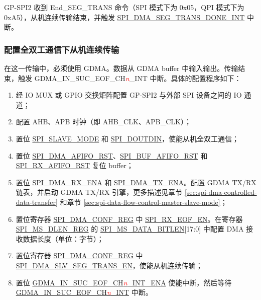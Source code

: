 \documentclass[main\_\_CN.tex]{subfiles}
\begin{document}
GP-SPI2 收到 End\_SEG\_TRANS 命令（SPI 模式下为 0x05，QPI 模式下为 0xA5），从机连续传输结束，并触发 \hyperref[int:SPIDMASEGTRANSDONEINT]{SPI\_DMA\_SEG\_TRANS\_DONE\_INT} 中断。

\subsubsection{配置全双工通信下从机连续传输}\label{para:spi-slave-fd-seg-trans}
在这一传输中，必须使用 GDMA。数据从 GDMA buffer 中输入输出。传输结束，触发 GDMA\_IN\_SUC\_EOF\_CH\textcolor{red}{\it{n}}\_INT  中断。具体的配置程序如下：

\begin{enumerate}
   \item 经 IO MUX 或 GPIO 交换矩阵配置 GP-SPI2 与外部 SPI 设备之间的 IO 通道；
   \item 配置 AHB、APB 时钟（即 AHB\_CLK、APB\_CLK）；

    \item 置位 \hyperref[fielddesc:SPISLAVEMODE]{SPI\_SLAVE\_MODE} 和 \hyperref[fielddesc:SPIDOUTDIN]{SPI\_DOUTDIN}，使能从机全双工通信；

    \item 置位 \hyperref[fielddesc:SPIDMAAFIFORST]{SPI\_DMA\_AFIFO\_RST}、\hyperref[fielddesc:SPIBUFAFIFORST]{SPI\_BUF\_AFIFO\_RST} 和 \hyperref[fielddesc:SPIRXAFIFORST]{SPI\_RX\_AFIFO\_RST} 复位 buffer；

    \item 置位 \hyperref[fielddesc:SPIDMARXENA]{SPI\_DMA\_RX\_ENA} 和 \hyperref[fielddesc:SPIDMATXENA]{SPI\_DMA\_TX\_ENA}。配置 GDMA TX/RX 链表，并启动 GDMA TX/RX 引擎，更多描述见章节 \ref{sec:spi-dma-controlled-data-transfer} 和章节 \ref{sec:spi-data-flow-control-master-slave-mode}；

    \item 置位寄存器 \hyperref[regdesc:SPIDMACONFREG]{SPI\_DMA\_CONF\_REG} 中 \hyperref[fielddesc:SPIRXEOFEN]{SPI\_RX\_EOF\_EN}。在寄存器 \hyperref[regdesc:SPIMSDLENREG]{SPI\_MS\_DLEN\_REG} 的 \hyperref[fielddesc:SPIMSDATABITLEN]{SPI\_MS\_DATA\_BITLEN}[17:0] 中配置 DMA 接收数据长度（单位：字节）；

    \item 置位寄存器 \hyperref[regdesc:SPIDMACONFREG]{SPI\_DMA\_CONF\_REG} 中 \hyperref[fielddesc:SPIDMASLVSEGTRANSEN]{SPI\_DMA\_SLV\_SEG\_TRANS\_EN}，使能从机连续传输；

    \item 置位 \hyperref[fielddesc:GDMAINSUCEOFCHNINTENA]{GDMA\_IN\_SUC\_EOF\_CH\textcolor{red}{\it{n}}\_INT\_ENA}  使能中断，然后等待 \hyperref[int:GDMAINSUCEOFINT]{GDMA\_IN\_SUC\_EOF\_CH\textcolor{red}{\it{n}}\_INT} 中断。
\end{enumerate}
\end{document}
